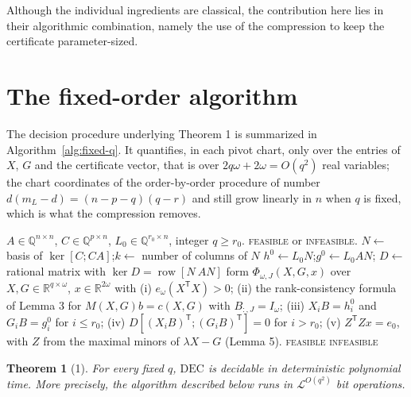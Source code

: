 \documentclass[journal]{IEEEtran}
\theoremstyle{plainn}
\newtheorem*{thm}{Theorem}
\theoremstyle{remark}
\begin{document}
Although the individual ingredients are classical, the contribution
here lies in their algorithmic combination, namely the use of the
compression to keep the certificate parameter-sized.



\section{The fixed-order algorithm}\label{sec:fixedq}
The decision procedure underlying Theorem 1 is summarized in
Algorithm~\ref{alg:fixed-q}. It quantifies, in each pivot chart, only over the entries of
$X$, $G$ and the certificate vector, that is over $2q\omega+2\omega=O(q^2)$ real variables;
the chart coordinates of the order-by-order procedure of \cite{fer26b} number
$d(m_L-d)=(n-p-q)(q-r)$ and still grow linearly in $n$ when $q$ is fixed, which is what the
compression removes.

\begin{algorithm}[!t]
\caption{Deciding $\mathrm{DEC}(q)$ for a fixed order $q$}
\label{alg:fixed-q}
\begin{algorithmic}[1]
\Require $A\in\mathbb Q^{n\times n}$, $C\in\mathbb Q^{p\times n}$,
$L_0\in\mathbb Q^{r_0\times n}$, integer $q\ge r_0$.
\Ensure \textsc{feasible} or \textsc{infeasible}.
\State $N\gets$ basis of $\ker[C;CA]$;\quad $k\gets$ number of columns of $N$
\State $h^0\gets L_0N$;\quad $g^0\gets L_0AN$;\quad
$D\gets$ rational matrix with $\ker D=\operatorname{row}[N\ AN]$
    \State form $\Phi_{\omega,J}(X,G,x)$ over $X,G\in\mathbb R^{q\times\omega}$,
           $x\in\mathbb R^{2\omega}$ with
    \Statex \quad (i) $e_\omega(X^{\mathsf T}X)>0$;
    \Statex \quad (ii) the rank-consistency formula of Lemma 3 for
           $M(X,G)b=c(X,G)$ with $B_{:,J}=I_\omega$;
    \Statex \quad (iii) $X_iB=h_i^0$ and $G_iB=g_i^0$ for $i\le r_0$;
    \Statex \quad (iv) $D[(X_iB)^{\mathsf T};(G_iB)^{\mathsf T}]=0$ for $i>r_0$;
    \Statex \quad (v) $Z^{\mathsf T}Zx=e_0$, with $Z$ from the maximal minors of
           $\lambda X-G$ (Lemma 5).
      \State \Return \textsc{feasible}
    \EndIf
  \EndFor
\EndFor
\State \Return \textsc{infeasible}
\end{algorithmic}
\end{algorithm}

\begin{thm}[1] For every fixed $q$, $\mathrm{DEC}$ is decidable in deterministic polynomial time. More precisely, the algorithm described below runs in $\mathcal L^{O(q^2)}$
bit operations.
\end{thm}
\end{document}
